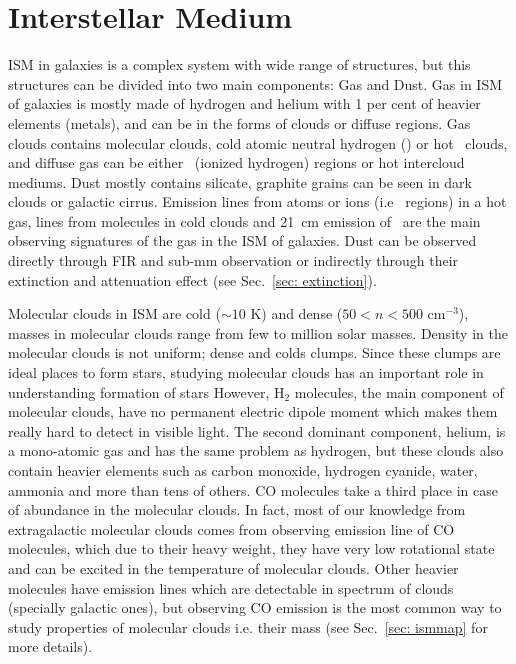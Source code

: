 

\section{Interstellar Medium}
\label{sec: ism_intro}
ISM in galaxies is a complex system with wide range of structures, but this structures can be divided into two main components: Gas and Dust.
Gas in ISM of galaxies is mostly made of hydrogen and helium with 1 per cent of heavier elements (metals), and can be in the forms of clouds or diffuse regions.
Gas clouds contains molecular clouds, cold atomic neutral hydrogen (\hi) or hot \hi~clouds, and diffuse gas can be either \hii~(ionized hydrogen) regions or hot intercloud mediums.
Dust mostly contains silicate, graphite grains can be seen in dark clouds or galactic cirrus.
Emission lines from atoms or ions (i.e \hii~regions) in a hot gas, lines from molecules in cold clouds and 21~cm emission of \hi~are the main observing signatures of the gas in the ISM of galaxies.
Dust can be observed directly through FIR and sub-mm observation or indirectly through their extinction and attenuation effect (see Sec.~\ref{sec: extinction}).

Molecular clouds in ISM are cold ($\sim10$ K) and dense ($ 50<n<500$ cm$^{-3}$), masses in molecular clouds range from few to million solar masses. %
Density in the molecular clouds is not uniform; dense and colds clumps.
Since these clumps are ideal places to form stars, studying molecular clouds has an important role in understanding formation of stars
However, H$_2$ molecules, the main component of molecular clouds, have no permanent electric dipole moment which makes them really hard to detect in visible light.
The second dominant component, helium, is a mono-atomic gas and has the same problem as hydrogen, but these clouds also contain heavier elements such as carbon monoxide, hydrogen cyanide, water, ammonia and more than tens of others.
CO molecules take a third place in case of abundance in the molecular clouds.
In fact, most of our knowledge from extragalactic molecular clouds comes from observing emission line of CO molecules, which due to their heavy weight, they have very low rotational state and can be excited in the temperature of molecular clouds. 
Other heavier molecules have emission lines which are detectable in spectrum of clouds (specially galactic ones), but observing CO emission is the most common way to study properties of molecular clouds i.e. their mass (see Sec.~\ref{sec: ismmap} for more details).

